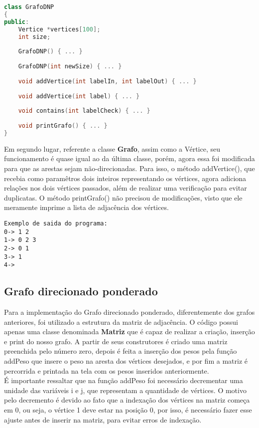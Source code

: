 \documentclass[12pt]{article}
\begin{document}
\begin{lstlisting}[language = C++]
class GrafoDNP
{
public:
    Vertice *vertices[100];
    int size;
    
    GrafoDNP() { ... }
    
    GrafoDNP(int newSize) { ... }
    
    void addVertice(int labelIn, int labelOut) { ... }
    
    void addVertice(int label) { ... }
    
    void contains(int labelCheck) { ... }
    
    void printGrafo() { ... }
}

\end{lstlisting}

Em segundo lugar, referente a classe \textbf{Grafo}, assim como a Vértice, seu funcionamento é quase igual ao da última classe, porém, agora essa foi modificada para que as arestas sejam não-direcionadas. Para isso, o método addVertice(), que recebia como paramêtros dois inteiros representando os vértices, agora adiciona relações nos dois vértices passados, além de realizar uma verificação para evitar duplicatas. O método printGrafo() não precisou de modificações, visto que ele meramente imprime a lista de adjacência dos vértices.

\begin{lstlisting}[]
Exemplo de saida do programa:
0-> 1 2 
1-> 0 2 3 
2-> 0 1 
3-> 1 
4-> 
\end{lstlisting}


\subsection{Grafo direcionado ponderado}
Para a implementação do Grafo direcionado ponderado, diferentemente dos grafos anteriores, foi utilizado a estrutura da matriz de adjacência. O código possui apenas uma classe denominada \textbf{Matriz} que é capaz de realizar a criação, inserção e print do nosso grafo. A partir de seus construtores é criado uma matriz preenchida pelo número zero, depois é feita a inserção dos pesos pela função addPeso que insere o peso na aresta dos vértices desejados, e por fim a matriz é percorrida e printada na tela com os pesos inseridos anteriormente. \\
É importante ressaltar que na função addPeso foi necessário decrementar uma unidade das variáveis i e j, que representam a quantidade de vértices. O motivo pelo decremento é devido ao fato que a indexação dos vértices na matriz começa em 0, ou seja, o vértice 1 deve estar na posição 0, por isso, é necessário fazer esse ajuste antes de inserir na matriz, para evitar erros de indexação.
\end{document}
